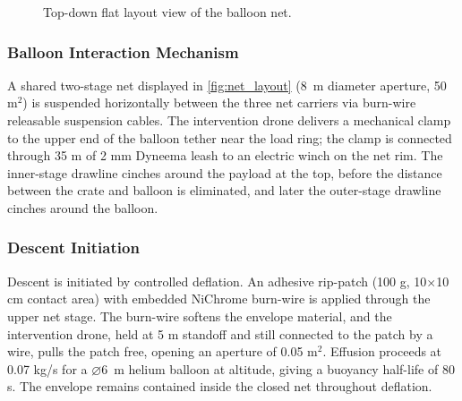 \begin{figure}[H]
{}
    \caption{Top-down flat layout view of the balloon net.}
    \label{fig:net_layout}
\end{figure}


\subsubsection{Balloon Interaction Mechanism}
A shared two-stage net displayed in \autoref{fig:net_layout} (8~m diameter aperture, 50 m$^2$) is suspended horizontally between the three net carriers via burn-wire releasable suspension cables. The intervention drone delivers a mechanical clamp to the upper end of the balloon tether near the load ring; the clamp is connected through 35 m of 2 mm Dyneema leash to an electric winch on the net rim. The inner-stage drawline cinches around the payload at the top, before the distance between the crate and balloon is eliminated, and later the outer-stage drawline cinches around the balloon.


\subsubsection{Descent Initiation}
Descent is initiated by controlled deflation. An adhesive rip-patch (100 g, 10$\times$10 cm contact area) with embedded NiChrome burn-wire is applied through the upper net stage. The burn-wire softens the envelope material, and the intervention drone, held at 5 m standoff and still connected to the patch by a wire, pulls the patch free, opening an aperture of 0.05 m$^2$. Effusion proceeds at 0.07 kg/s for a $\varnothing$6~m helium balloon at altitude, giving a buoyancy half-life of 80 s. The envelope remains contained inside the closed net throughout deflation.


